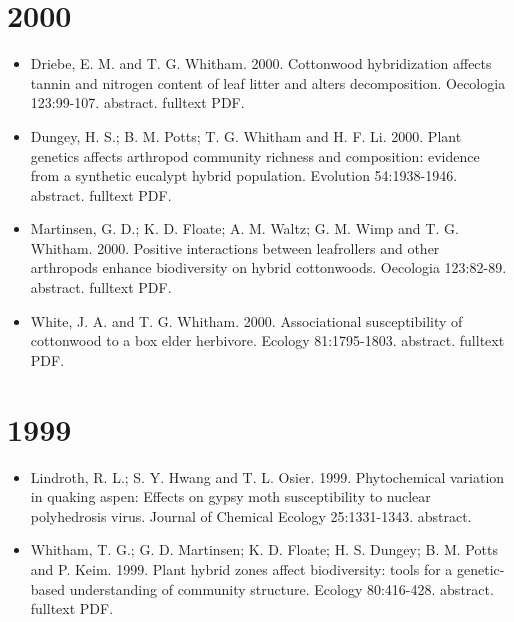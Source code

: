 \documentclass[12pt]{article}
\begin{document}
\section{2000}
\begin{itemize}
\item Driebe, E. M. and T. G. Whitham. 2000. Cottonwood hybridization
affects tannin and nitrogen content of leaf litter and alters
decomposition. Oecologia 123:99-107. abstract. fulltext PDF.
 
\item Dungey, H. S.; B. M. Potts; T. G. Whitham and H. F. Li. 2000. Plant
genetics affects arthropod community richness and composition:
evidence from a synthetic eucalypt hybrid population. Evolution
54:1938-1946. abstract. fulltext PDF.
 
\item Martinsen, G. D.; K. D. Floate; A. M. Waltz; G. M. Wimp and
T. G. Whitham. 2000. Positive interactions between leafrollers and
other arthropods enhance biodiversity on hybrid cottonwoods. Oecologia
123:82-89. abstract. fulltext PDF.
 
\item White, J. A. and T. G. Whitham. 2000. Associational susceptibility of
cottonwood to a box elder herbivore. Ecology
81:1795-1803. abstract. fulltext PDF.
 
\end{itemize}

\section{1999}
\begin{itemize}
\item Lindroth, R. L.; S. Y. Hwang and T. L. Osier. 1999. Phytochemical
variation in quaking aspen: Effects on gypsy moth susceptibility to
nuclear polyhedrosis virus. Journal of Chemical Ecology
25:1331-1343. abstract.
 
\item Whitham, T. G.; G. D. Martinsen; K. D. Floate; H. S. Dungey;
B. M. Potts and P. Keim. 1999. Plant hybrid zones affect biodiversity:
tools for a genetic-based understanding of community
structure. Ecology 80:416-428. abstract. fulltext PDF.
 
\end{itemize}
\end{document}
